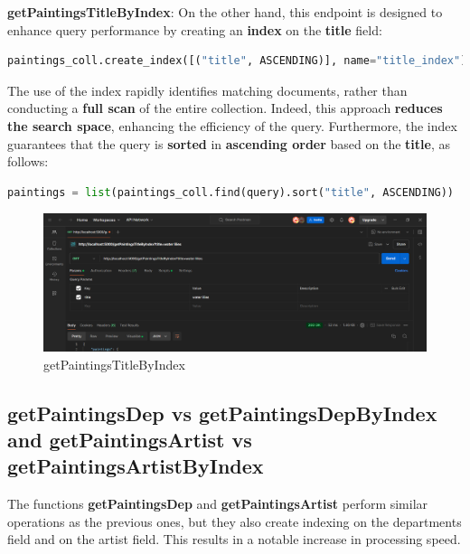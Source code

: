 \documentclass[a4paper,12pt]{article}
\begin{document}
\textbf{getPaintingsTitleByIndex}: On the other hand, this endpoint is designed to enhance query performance by creating an \textbf{index} on the \textbf{title} field:
\begin{lstlisting}[language=Python]
paintings_coll.create_index([("title", ASCENDING)], name="title_index")
\end{lstlisting}
The use of the index rapidly identifies matching documents, rather than conducting a \textbf{full scan} of the entire collection. Indeed, this approach \textbf{reduces the search space}, enhancing the efficiency of the query. Furthermore, the index guarantees that the query is \textbf{sorted} in \textbf{ascending order} based on the \textbf{title}, as follows:
\begin{lstlisting}[language=Python]
paintings = list(paintings_coll.find(query).sort("title", ASCENDING))
\end{lstlisting}

\begin{figure}[h]
      \centering
      \includegraphics[width=1\textwidth]{images/getPaintingsTitleByIndexS.png}
      \caption{getPaintingsTitleByIndex}
\end{figure}

\subsection{getPaintingsDep vs getPaintingsDepByIndex and getPaintingsArtist vs getPaintingsArtistByIndex}

The functions \textbf{getPaintingsDep} and \textbf{getPaintingsArtist} perform similar operations as the previous ones, but they also create indexing on the departments field and on the artist field. This results in a notable increase in processing speed.
\end{document}
